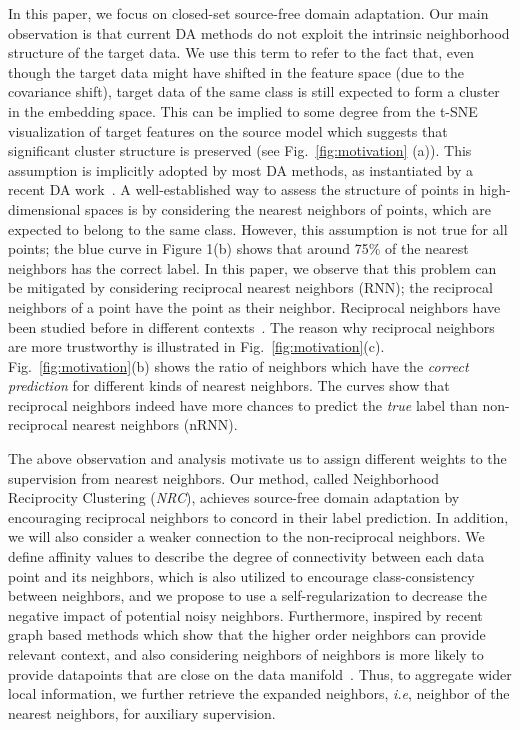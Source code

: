\documentclass{article}
\begin{document}
In this paper, we focus on closed-set source-free domain adaptation. Our main observation is that current DA methods do not exploit the intrinsic neighborhood structure of the target data. We use this term to refer to the fact that, even though the target data might have shifted in the feature space (due to the covariance shift), target data of the same class is still expected to form a cluster in the embedding space. This can be implied to some degree from the t-SNE visualization of target features on the source model which suggests that significant cluster structure is preserved (see Fig.~\ref{fig:motivation} (a)). This assumption is implicitly adopted by most DA methods, as instantiated by a recent DA work~\cite{tang2020unsupervised}.
A well-established way to assess the structure of points in high-dimensional spaces is by considering the nearest neighbors of points, which are expected to belong to the same class. However, this assumption is not true for all points; the blue curve in Figure 1(b) shows that around 75\% of the nearest neighbors has the correct label. In this paper, we observe that this problem can be mitigated by considering reciprocal nearest neighbors (RNN); the reciprocal neighbors of a point have the point as their neighbor. Reciprocal neighbors have been studied before in different contexts~\cite{jegou2007contextual,qin2011hello,zhong2017re}. The reason why reciprocal neighbors are more trustworthy is illustrated in Fig.~\ref{fig:motivation}(c). Fig.~\ref{fig:motivation}(b) shows the ratio of neighbors which have the \textit{correct prediction} for different kinds of nearest neighbors. The curves show that reciprocal neighbors indeed have more chances to predict the \textit{true} label than non-reciprocal nearest neighbors (nRNN).

The above observation and analysis motivate us to assign different weights to the supervision from nearest neighbors. Our method, called Neighborhood Reciprocity Clustering (\textit{{NRC}}), achieves source-free domain adaptation by encouraging reciprocal neighbors to concord in their label prediction. In addition, we will also consider a weaker connection to the non-reciprocal neighbors. We define affinity values to describe the degree of connectivity between each data point and its neighbors, which is also utilized to encourage class-consistency between neighbors, and we propose to use a self-regularization to decrease the negative impact of potential noisy neighbors. Furthermore, inspired by recent graph based methods \cite{altenburger2018monophily,chin2019decoupled,zhu2020beyond} which show that the higher order neighbors can provide relevant context, and also considering neighbors of neighbors is more likely to provide datapoints that are close on the data manifold~\cite{tenenbaum2000global}. Thus, to aggregate wider local information, we further retrieve the expanded neighbors, \textit{i.e}, neighbor of the nearest neighbors, for auxiliary supervision.
\end{document}
